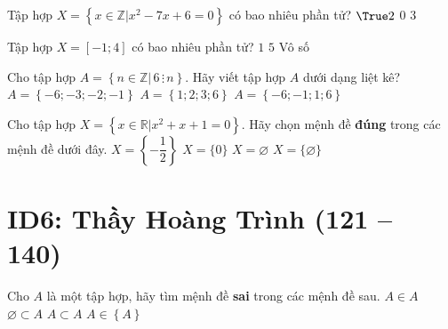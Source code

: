 \begin{ex}%
	Tập hợp $X = \left\{x \in \mathbb{Z}\big|x^2 - 7x + 6 = 0\right\}$ có bao nhiêu phần tử?
	{$\True 2$}
	{$0$}
	{$3$}
\end{ex}

\begin{ex}%
	Tập hợp $X = \left[-1;4\right]$ có bao nhiêu phần tử?
	{$1$}
	{$5$}
	{\True Vô số}
\end{ex}

\begin{ex}%
	Cho tập hợp $A = \left\{n \in \mathbb{Z}\big| \,6 \, \vdots \, n\right\}$. Hãy viết tập hợp $A$ dưới dạng liệt kê?
	{$A = \left\{-6;-3;-2;-1\right\}$}
	{$A = \left\{1;2;3;6\right\}$}
	{$A = \left\{-6;-1;1;6\right\}$}
\end{ex}

\begin{ex}%
	Cho tập hợp $X=\left\{x\in \mathbb{R}\big|x^2+x+1=0\right\} $. Hãy chọn mệnh đề \textbf{đúng} trong các mệnh đề dưới đây.
	\choice
	{$X=\left\{-\dfrac{1}{2}\right\}$}
	{$X=\lbrace 0\rbrace$}
	{\True $X=\varnothing$}
	{$X=\lbrace \varnothing\rbrace$}
\end{ex}



\section*{ID6: Thầy Hoàng Trình (121 -- 140)}
\begin{ex}%
	Cho $A$ là một tập hợp, hãy tìm mệnh đề \textbf{sai} trong các mệnh đề sau.
	\choice
	{\True $A\in A$}
	{$\varnothing \subset A$}
	{$A\subset A$}
	{$A\in \left\{ A\right\}$}
\end{ex}

